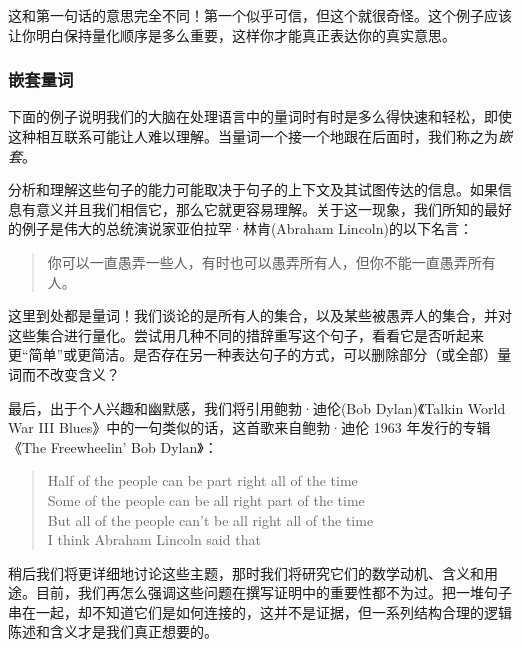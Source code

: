 这和第一句话的意思完全不同！第一个似乎可信，但这个就很奇怪。这个例子应该让你明白保持量化顺序是多么重要，这样你才能真正表达你的真实意思。

\subsubsection*{嵌套量词}

下面的例子说明我们的大脑在处理语言中的量词时有时是多么得快速和轻松，即使这种相互联系可能让人难以理解。当量词一个接一个地跟在后面时，我们称之为\emph{嵌套}。

分析和理解这些句子的能力可能取决于句子的上下文及其试图传达的信息。如果信息有意义并且我们相信它，那么它就更容易理解。关于这一现象，我们所知的最好的例子是伟大的总统演说家亚伯拉罕·林肯(Abraham Lincoln)的以下名言：

\begin{quote}
    你可以一直愚弄一些人，有时也可以愚弄所有人，但你不能一直愚弄所有人。
\end{quote}

这里到处都是量词！我们谈论的是所有人的集合，以及某些被愚弄人的集合，并对这些集合进行量化。尝试用几种不同的措辞重写这个句子，看看它是否听起来更``简单''或更简洁。是否存在另一种表达句子的方式，可以删除部分（或全部）量词而不改变含义？

最后，出于个人兴趣和幽默感，我们将引用鲍勃·迪伦(Bob Dylan)《Talkin World War III Blues》中的一句类似的话，这首歌来自鲍勃·迪伦 1963 年发行的专辑《The Freewheelin' Bob Dylan》：

\begin{quote}
    Half of the people can be part right all of the time\\
    Some of the people can be all right part of the time\\
    But all of the people can't be all right all of the time\\
    I think Abraham Lincoln said that
\end{quote}

稍后我们将更详细地讨论这些主题，那时我们将研究它们的数学动机、含义和用途。目前，我们再怎么强调这些问题在撰写证明中的重要性都不为过。把一堆句子串在一起，却不知道它们是如何连接的，这并不是证据，但一系列结构合理的逻辑陈述和含义才是我们真正想要的。